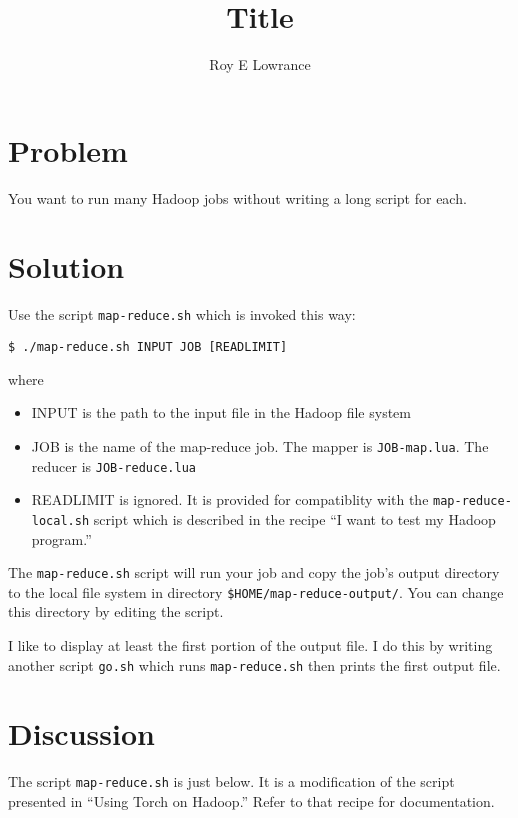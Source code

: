 \documentclass{article}
\let\code\texttt %
\begin{document}
\title{Title}
\author{Roy E Lowrance}
\maketitle


\section{Problem}

You want to run many Hadoop jobs without writing a long script for each.

\section{Solution}

Use the script \code{map-reduce.sh} which is invoked this way:

\begin{verbatim}
$ ./map-reduce.sh INPUT JOB [READLIMIT]
\end{verbatim}

where
\begin{itemize}
  \item INPUT is the path to the input file in the Hadoop file system
  \item JOB is the name of the map-reduce job. The mapper is
    \code{JOB-map.lua}.  The reducer is \code{JOB-reduce.lua}
  \item READLIMIT is ignored. It is provided for compatiblity with the 
    \code{map-reduce-local.sh} script which is described in the recipe ``I
    want to test my Hadoop program.''
\end{itemize}

The \code{map-reduce.sh} script will run your job and copy the job's
output directory to the local file system in directory
\code{\$HOME/map-reduce-output/}. You can change this directory by
editing the script.

I like to display at least the first portion of the output file. I do
this by writing another script \code{go.sh} which runs \code{map-reduce.sh} then
prints the first output file.

\section{Discussion}

The script \code{map-reduce.sh} is just below. It is a modification of
the script presented in ``Using Torch on Hadoop.'' Refer to that recipe
for documentation.
\end{document}
